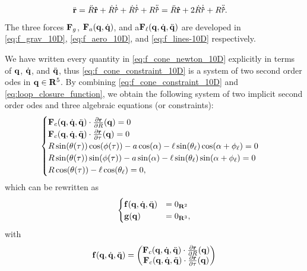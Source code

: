 %
\begin{equation}\begin{split}
    \ddot{\vb r} &= \ddot R \vu r + \dot R \dot{\vu r} + \dot R \dot{\vu r} + R \ddot{\vu r} = \ddot R \vu r + 2 \dot R \dot{\vu r} + R \ddot{\vu r}.
\end{split}\end{equation}
%
%
The three forces $\vb F_g$, $\vb F_a(\vb q, \dot{\vb q})$, and a$\vb F_\ell(\vb q, \dot{\vb q}, \ddot{\vb q})$ are developed in \eqref{eq:f_grav_10D}, \eqref{eq:f_aero_10D}, and \eqref{eq:f_lines-10D} respectively.

We have written every quantity in \eqref{eq:f_cone_newton_10D} explicitly in terms of $\vb q$, $\dot{\vb q}$, and $\ddot{\vb q}$, thus \eqref{eq:f_cone_constraint_10D} is a system of two second order \ac{ode}s in $\vb q \in \mathbf{R}^5$.
By combining \eqref{eq:f_cone_constraint_10D} and \eqref{eq:loop_closure_function}, we obtain the following system of two implicit second order \ac{ode}s and three algebraic equations (or constraints):
%
\begin{equation}\begin{cases}
    \vb F_c(\vb q, \dot{\vb q}, \ddot{\vb q}) \cdot {\pdv{\vb r}{R}}(\vb q) = 0 \\
    \vb F_c(\vb q, \dot{\vb q}, \ddot{\vb q}) \cdot {\pdv{\vb r}{\tau}}(\vb q) = 0 \\
    R \sin(\theta(\tau)) \cos(\phi(\tau)) - a \cos(\alpha) - \ell \sin(\theta_\ell) \cos(\alpha + \phi_\ell) = 0 \\
    R \sin(\theta(\tau)) \sin(\phi(\tau)) - a \sin(\alpha) - \ell \sin(\theta_\ell) \sin(\alpha + \phi_\ell) = 0 \\
    R \cos(\theta(\tau)) - \ell \cos(\theta_\ell) = 0,
\end{cases}\end{equation}
%
which can be rewritten as
%
\begin{equation}\begin{cases} \label{eq:dae}
    \vb f(\vb q, \dot{\vb q}, \ddot{\vb q}) &= 0_{\mathbf{R}^2} \\
    \vb g(\vb q) &= 0_{\mathbf{R}^3},
\end{cases}\end{equation}
%
with
%
\begin{equation}
    \vb f(\vb q, \dot{\vb q}, \ddot{\vb q}) = \begin{pmatrix}
        \vb F_c(\vb q, \dot{\vb q}, \ddot{\vb q}) \cdot {\pdv{\vb r}{R}}(\vb q) \\
        \vb F_c(\vb q, \dot{\vb q}, \ddot{\vb q}) \cdot {\pdv{\vb r}{\tau}}(\vb q)
    \end{pmatrix}
\end{equation}


